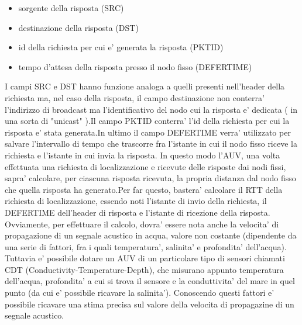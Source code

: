 \begin{itemize}
    \item sorgente della risposta (SRC)
    \item destinazione della risposta (DST)
    \item id della richiesta per cui e' generata la risposta (PKTID)
    \item tempo d'attesa della risposta presso il nodo fisso (DEFERTIME)
\end{itemize}
I campi SRC e DST hanno funzione analoga a quelli presenti nell'header della richiesta ma, nel caso della risposta, il campo destinazione non conterra' l'indirizzo di broadcast ma l'identificativo del nodo cui la risposta e' dedicata ( in una sorta di "unicast" ).\newline Il campo PKTID conterra' l'id della richiesta per cui la risposta e' stata generata.\newline In ultimo il campo DEFERTIME verra' utilizzato per salvare l'intervallo di tempo che trascorre fra l'istante in cui il nodo fisso riceve la richiesta e l'istante in cui invia la risposta.\newline
In questo modo l'AUV, una volta effettuata una richiesta di localizzazione e ricevute delle risposte dai nodi fissi, 
sapra' calcolare, per ciascuna risposta ricevuta, la propria distanza dal nodo fisso che quella risposta ha generato.\newline Per far questo, bastera' calcolare il RTT della richiesta di localizzazione,
essendo noti l'istante di invio della richiesta, il DEFERTIME dell'header di risposta  e  l'istante di ricezione della risposta. Ovviamente, per effettuare il calcolo, dovra' essere nota anche la velocita' di propagazione di un segnale acustico in acqua, valore non costante (dipendente da una serie di fattori, fra i quali temperatura', salinita' e profondita' dell'acqua). Tuttavia e' possibile dotare un AUV  di un particolare tipo di sensori chiamati CDT (Conductivity-Temperature-Depth), che misurano appunto temperatura dell'acqua, profondita' a cui si trova il sensore e la conduttivita' del mare in quel punto (da cui e' possibile ricavare la salinita'). Conoscendo  questi fattori e' possibile ricavare una stima precisa sul valore della velocita di propagazine di un segnale acustico. 

